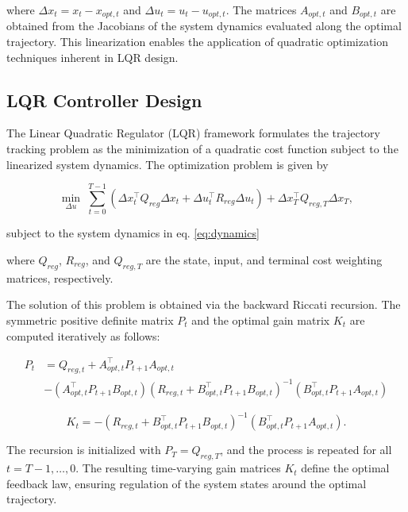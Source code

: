 \documentclass[a4paper,11pt,oneside]{book}
\begin{document}
where $\Delta x_t = x_t - x_{opt,t}$ and $\Delta u_t = u_t - u_{opt,t}$. The matrices $A_{opt,t}$ and $B_{opt,t}$ are obtained from the Jacobians of the system dynamics evaluated along the optimal trajectory. This linearization enables the application of quadratic optimization techniques inherent in LQR design.

\subsection{LQR Controller Design}

The Linear Quadratic Regulator (LQR) framework formulates the trajectory tracking problem 
as the minimization of a quadratic cost function subject to the linearized system dynamics. 
The optimization problem is given by

\begin{equation}
\min_{\Delta u} \; 
\sum_{t=0}^{T-1} 
\left( \Delta x_t^\top Q_{reg} \Delta x_t + \Delta u_t^\top R_{reg} \Delta u_t \right) 
+ \Delta x_T^\top Q_{reg,T} \Delta x_T,
\label{eq:lqr_cost}
\end{equation}

subject to the system dynamics in eq. \ref{eq:dynamics}

where $Q_{reg}$, $R_{reg}$, and $Q_{reg,T}$ are the state, input, and terminal cost weighting matrices, respectively.  

The solution of this problem is obtained via the backward Riccati recursion. 
The symmetric positive definite matrix $P_t$ and the optimal gain matrix $K_t$ are computed iteratively as follows:

\begin{align}
P_t &= Q_{reg,t} + A_{opt,t}^\top P_{t+1} A_{opt,t} \nonumber \\
&- \left(A_{opt,t}^\top P_{t+1} B_{opt,t}\right)
\left(R_{reg,t} + B_{opt,t}^\top P_{t+1} B_{opt,t}\right)^{-1}
\left(B_{opt,t}^\top P_{t+1} A_{opt,t}\right)
\end{align}

\begin{equation}
K_t = -\left(R_{reg,t} + B_{opt,t}^\top P_{t+1} B_{opt,t}\right)^{-1}
\left(B_{opt,t}^\top P_{t+1} A_{opt,t}\right).
\label{eq:gain}
\end{equation}

The recursion is initialized with $P_T = Q_{reg,T}$, 
and the process is repeated for all $t = T-1, \ldots, 0$. 
The resulting time-varying gain matrices $K_t$ define the optimal feedback law, 
ensuring regulation of the system states around the optimal trajectory.
\end{document}
